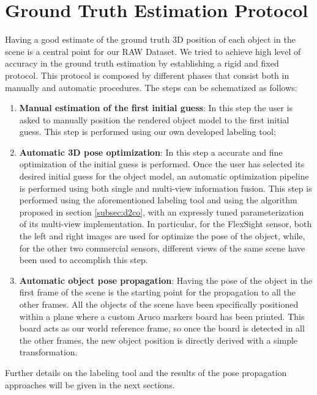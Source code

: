 \section{Ground Truth Estimation Protocol}\label{sec:ground_truth_estim}
Having a good estimate of the ground truth 3D position of each object in the scene is a central point for our RAW Dataset. We tried to achieve high level of accuracy in the ground truth estimation by establishing a rigid and fixed protocol. This protocol is composed by different phases that consist both in manually and automatic procedures. The steps can be schematized as follows:

\begin{enumerate}
	\item \textbf{Manual estimation of the first initial guess}: In this step the user is asked to manually position the rendered object model to the first initial guess. This step is performed using our own developed labeling tool;
	\item \textbf{Automatic 3D pose optimization}: In this step a accurate and fine optimization of the initial guess is performed. Once the user has selected its desired initial guess for the object model, an automatic optimization pipeline is performed using both single and multi-view information fusion. This step is performed using the aforementioned labeling tool and using the algorithm proposed in section \ref{subsec:d2co}, with an expressly tuned parameterization of its multi-view implementation. In particular, for the FlexSight sensor, both the left and right images are used for optimize the pose of the object, while, for the other two commercial sensors, different views of the same scene have been used to accomplish this step.
	\item \textbf{Automatic object pose propagation}: Having the pose of the object in the first frame of the scene is the starting point for the propagation to all the other frames. All the objects of the scene have been specifically positioned within a plane where a custom Aruco markers board has been printed. This board acts as our world reference frame, so once the board is detected in all the other frames, the new object position is directly derived with a simple transformation.
\end{enumerate}

Further details on the labeling tool and the results of the pose propagation approaches will be given in the next sections.

